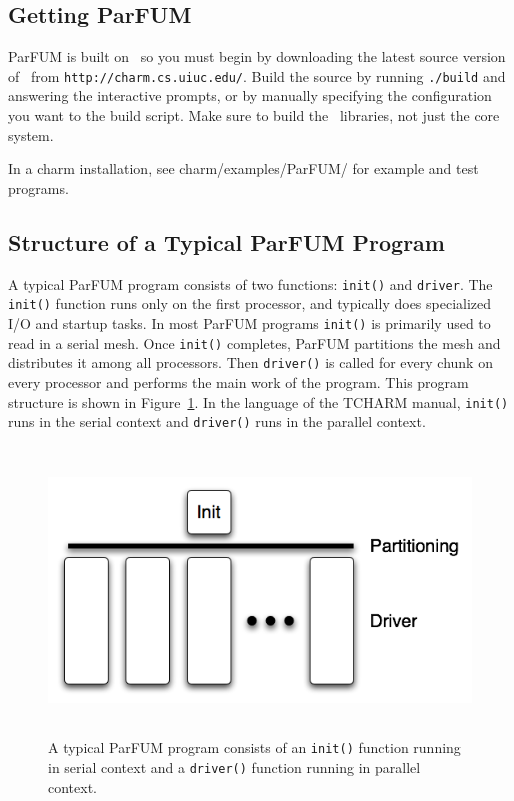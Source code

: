 \subsection{Getting ParFUM}\label{sec:getting_parfum}

ParFUM is built on \charmpp\, so you must begin by
downloading the latest source version of \charmpp\ from
{\tt http://charm.cs.uiuc.edu/}.  Build the source by running  
{\tt ./build} and answering the interactive prompts, or by manually specifying the configuration you want to the build script. Make sure to build the \charmpp\ libraries, not just the core system.

In a charm installation, see charm/examples/ParFUM/ for example and test programs.


\subsection{Structure of a Typical ParFUM Program}

A typical ParFUM program consists of two functions: {\tt init()} and {\tt driver}. The {\tt init()} function runs only on the first processor, and typically does specialized I/O and startup tasks. In most ParFUM programs {\tt init()} is primarily used to read in a serial mesh. Once {\tt init()} completes, ParFUM partitions the mesh and distributes it among all processors. Then {\tt driver()} is called for every chunk on every processor and performs the main work of the program. This program structure is shown in Figure~\ref{fig:parfum_structure}. In the language of the TCHARM manual, {\tt init()} runs in the serial context and {\tt driver()} runs in the parallel context.

\begin{figure}[h]
\begin{center}
\includegraphics[height=3in]{fig/parfum_structure}
\end{center}
\caption{A typical ParFUM program consists of an {\tt init()} function running in serial context and a {\tt driver()} function running in parallel context.}
\label{fig:parfum_structure}
\end{figure}

